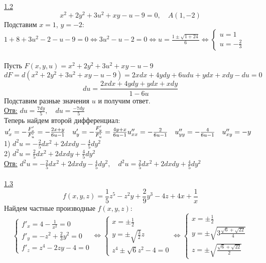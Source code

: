 \documentclass{article}
\begin{document}
\underline{1.2}
\[ x^2 + 2y^2 + 3u^2 + xy - u - 9 = 0, \quad A(1, -2) \]
Подставим $x = 1$, $y = -2$:\\
\( 1 + 8 + 3u^2 - 2 - u - 9 = 0 \Leftrightarrow 3u^2 - u - 2 = 0 \Leftrightarrow 
u = \frac{1 \pm \sqrt{1 + 24}}{6} \Leftrightarrow 
\begin{cases}
u = 1 \\
u = - \frac{2}{3}
\end{cases}\) \\ \\
Пусть $F(x, y, u) = x^2 + 2y^2 + 3u^2 + xy - u - 9$ \\
\( dF = d(x^2 + 2y^2 + 3u^2 + xy -u -9) = 2xdx + 4ydy + 6udu + ydx + xdy - du = 0 \) \\
\[ du = \frac{2xdx + 4ydy + ydx + xdy}{1 - 6u} \]
Подставим разные значения $u$ и получим ответ. \\
\underline{Отв:} 
\( du = \frac{7dy }{5}, \quad du = \frac{-7dy}{5}\) \\
Теперь найдем второй дифференциал: \\
\( u'_x = -\frac{F'_x}{F'_u} = - \frac{2x + y}{6u - 1}
\quad u'_y = -\frac{F'_y}{F'_u} = \frac{4y + x}{6u - 1} \\
u''_{xx} = -\frac{2}{6u - 1} \quad u''_{yy} = -\frac{4}{6u - 1} 
\quad u''_{xy} = -y \\
\) \\
1) \(   d^2 u = - \frac{2}{5} dx^2 + 2dxdy - \frac{4}{5} dy^2\) \\
2) \(   d^2 u =  \frac{2}{5} dx^2 + 2dxdy + \frac{4}{5} dy^2\)
\\ 
\underline{Отв:}
 \(   d^2 u = - \frac{2}{5} dx^2 + 2dxdy - \frac{4}{5} dy^2, \quad
  d^2 u =  \frac{2}{5} dx^2 + 2dxdy + \frac{4}{5} dy^2\)
\\ \\
\underline{1.3}
\[ f(x, y, z) = \frac{1}{5}z^5 - z^2y + \frac{2}{9}y^3 - 4z + 4x + \frac{1}{x}\]
Найдем частные производные $f(x, y, z)$:
\begin{equation*}
    \begin{cases}
    f'_x = 4 - \frac{1}{x^2} = 0 \\
    f'_y = -z^2 + \frac{2}{3} y^2 = 0\\
    f'_z = z^4 - 2zy - 4 = 0
    \end{cases}
    \Leftrightarrow
    \begin{cases}
    x = \pm \frac{1}{2} \\
    y = \pm \sqrt{\frac{3}{2}} z\\
    z^4 \pm \sqrt{6}z^2 - 4 = 0
    \end{cases}
    \Leftrightarrow
    \begin{cases}
    x = \pm \frac{1}{2} \\
    y = \pm \sqrt{3\frac{\sqrt{6} + \sqrt{22}}{4}}\\
    z = \pm\sqrt{\frac{\sqrt{6} + \sqrt{22}}{2}}
    \end{cases}
\end{equation*}
\end{document}
